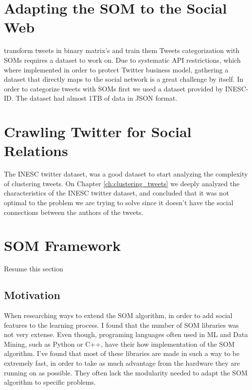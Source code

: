 \label{ch:clustering_tweets}

\section{Adapting the SOM to the Social Web}
\label{sec:adapting_the_som_to_the_social_web}

{\color{red} transform tweets in binary matrix's and train them }
Tweets categorization with \ac{SOMs} requires a dataset to work on. Due to systematic API restrictions, which where implemented in order to protect Twitter business model, gathering a dataset that directly maps to the social network is a great challenge by itself. 
In order to categorize tweets with \ac{SOMs} first we used a dataset provided by INESC-ID. The dataset had almost 1TB of data in \ac{JSON} format.

\section{Crawling Twitter for Social Relations}
\label{sec:crawling_twitter}
The INESC twitter dataset, was a good dataset to start analyzing the complexity of clustering tweets. On Chapter \ref{ch:clustering_tweets} we deeply analyzed the characteristics of the INESC twitter dataset, and concluded that it was not optimal to the problem we are trying to solve since it doesn't have the social connections between the authors of the tweets.

\section{SOM Framework}
{\color{red} Resume this section }

\subsection{Motivation}
\label{sec:motivation}
When researching ways to extend the \ac{SOM} algorithm, in order to add social features to the learning process. I found that the number of \ac{SOM} libraries was not very extense. Even though, programing languages often used in \ac{ML} and Data Mining, such as Python or C++, have their how implementation of the \ac{SOM} algorithm. I've found that most of these libraries are made in such a way to be extremely fast, in order to take as much advantage from the hardware they are running on as possible. They often lack the modularity needed to adapt the \ac{SOM} algorithm to specific problems.

